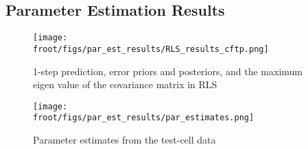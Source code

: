 \subsection{Parameter Estimation Results}

\begin{figure}[H]
        \centering
        \texttt{[image: \\froot/figs/par\_est\_results/RLS\_results\_cftp.png]}
        \caption{1-step prediction, error priors and posteriors, and the maximum eigen value of the covariance matrix in RLS}
\end{figure}

\begin{figure}[H]
        \centering
        \texttt{[image: \\froot/figs/par\_est\_results/par\_estimates.png]}
        \caption{Parameter estimates from the test-cell data}
\end{figure}
